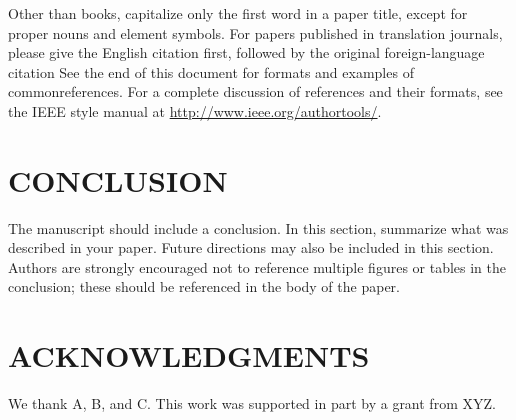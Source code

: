 \documentclass{IEEEmce}
\begin{document}
Other than books, capitalize only the first word in a paper title, except for proper nouns and element symbols. For papers published in translation journals, please give the English citation first, followed by the original foreign-language citation See the end of this document for formats and examples of common\break references. For a complete discussion of references and their formats, see the IEEE style manual at \url{http://www.ieee.org/authortools/}.\vspace*{-2pt}

\section{CONCLUSION}

The manuscript should include a conclusion. In this section, summarize what was described in your paper. Future directions may also be included in this section. Authors are strongly encouraged not to reference multiple figures or tables in the conclusion; these should be referenced in the body of the paper.

\section{ACKNOWLEDGMENTS}

We thank A, B, and C. This work was supported in part by a grant from XYZ.

\end{document}
